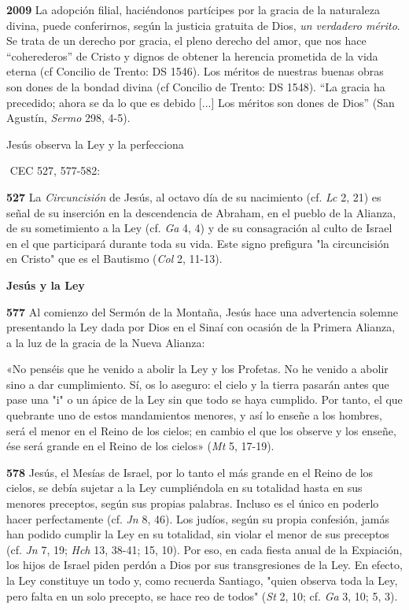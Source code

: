 \documentclass[]{article}
\begin{document}
\textbf{2009} La adopción filial, haciéndonos partícipes por la gracia
de la naturaleza divina, puede conferirnos, según la justicia gratuita
de Dios, \emph{un verdadero mérito}. Se trata de un derecho por gracia,
el pleno derecho del amor, que nos hace ``coherederos'' de Cristo y
dignos de obtener la herencia prometida de la vida eterna (cf Concilio
de Trento: DS 1546). Los méritos de nuestras buenas obras son dones de
la bondad divina (cf Concilio de Trento: DS 1548). ``La gracia ha
precedido; ahora se da lo que es debido {[}...{]} Los méritos son dones
de Dios'' (San Agustín, \emph{Sermo} 298, 4-5).

Jesús observa la Ley y la perfecciona 

 CEC 527, 577-582:

\textbf{527} La \emph{Circuncisión} de Jesús, al octavo día de su
nacimiento (cf. \emph{Lc} 2, 21) es señal de su inserción en la
descendencia de Abraham, en el pueblo de la Alianza, de su sometimiento
a la Ley (cf. \emph{Ga} 4, 4) y de su consagración al culto de Israel en
el que participará durante toda su vida. Este signo prefigura "la
circuncisión en Cristo" que es el Bautismo (\emph{Col} 2, 11-13).

\textbf{Jesús y la Ley}

\textbf{577} Al comienzo del Sermón de la Montaña, Jesús hace una
advertencia solemne presentando la Ley dada por Dios en el Sinaí con
ocasión de la Primera Alianza, a la luz de la gracia de la Nueva
Alianza:

«No penséis que he venido a abolir la Ley y los Profetas. No he venido a
abolir sino a dar cumplimiento. Sí, os lo aseguro: el cielo y la tierra
pasarán antes que pase una "i" o un ápice de la Ley sin que todo se haya
cumplido. Por tanto, el que quebrante uno de estos mandamientos menores,
y así lo enseñe a los hombres, será el menor en el Reino de los cielos;
en cambio el que los observe y los enseñe, ése será grande en el Reino
de los cielos» (\emph{Mt} 5, 17-19).

\textbf{578} Jesús, el Mesías de Israel, por lo tanto el más grande en
el Reino de los cielos, se debía sujetar a la Ley cumpliéndola en su
totalidad hasta en sus menores preceptos, según sus propias palabras.
Incluso es el único en poderlo hacer perfectamente (cf. \emph{Jn} 8,
46). Los judíos, según su propia confesión, jamás han podido cumplir la
Ley en su totalidad, sin violar el menor de sus preceptos (cf. \emph{Jn}
7, 19; \emph{Hch} 13, 38-41; 15, 10). Por eso, en cada fiesta anual de
la Expiación, los hijos de Israel piden perdón a Dios por sus
transgresiones de la Ley. En efecto, la Ley constituye un todo y, como
recuerda Santiago, "quien observa toda la Ley, pero falta en un solo
precepto, se hace reo de todos" (\emph{St} 2, 10; cf. \emph{Ga} 3, 10;
5, 3).
\end{document}

